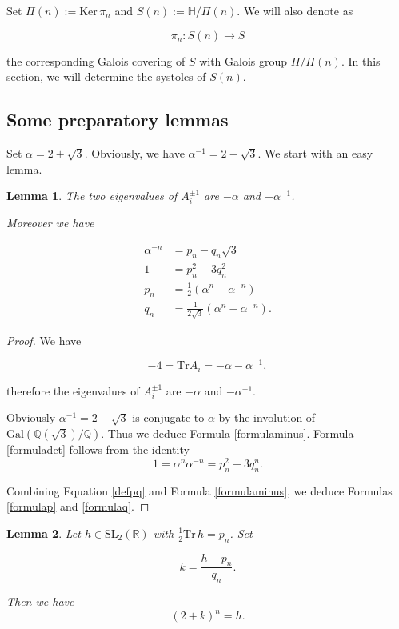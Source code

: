 \documentclass[12pt]{amsart}
\newcommand{\HP}{\mathbb{H}}
\newcommand{\Q}{\mathbb{Q}}
\newcommand{\R}{\mathbb{R}}
\newcommand{\Gal}{{\mathrm {Gal}}}
\newcommand{\Ker}{\mathrm{Ker}}
\newcommand{\SL}{{\mathrm {SL}}}
\newcommand{\Tr}{{\mathrm {Tr}}}
\newtheorem{lemma}{Lemma}
\begin{document}
\noindent Set $\Pi(n):=\Ker\,\pi_n$ and
$S(n):=\HP/\Pi(n).$ We will also denote as

$$\pi_n:S(n)\to S$$

\noindent the corresponding Galois covering of $S$ with Galois group $\Pi/\Pi(n)$. In this section,
we will determine the systoles of $S(n)$.

\subsection{Some preparatory lemmas}

Set $\alpha=2+\sqrt{3}$. Obviously, we have
$\alpha^{-1}=2-\sqrt{3}$.
We start with an easy lemma.


\begin{lemma}\label{formulas} The two eigenvalues of
$A_i^{\pm 1}$ are $-\alpha$ and $-\alpha^{-1}$.

Moreover we have

\begin{align}
\alpha^{-n}&=p_n-q_n\sqrt{3}\label{formulaminus}\\
1&=p_n^2-3q_n^2 \label{formuladet}\\
p_n&= \frac{1}{2}(\alpha^{n}+\alpha^{-n}) \label{formulap}\\
q_n&= \frac{1}{2\sqrt{3}}(\alpha^{n}-\alpha^{-n}).  \label{formulaq}
\end{align}
\end{lemma}


\begin{proof} We have

$$-4=\Tr A_i=-\alpha-\alpha^{-1},$$ 

\noindent therefore 
the eigenvalues of
$A_i^{\pm 1}$ are $-\alpha$ and $-\alpha^{-1}$.


Obviously
$\alpha^{-1}=2-\sqrt{3}$ is conjugate to $\alpha$ by the involution
of $\Gal(\Q(\sqrt{3})/\Q)$. Thus we deduce  
Formula \ref{formulaminus}. Formula
\ref{formuladet} follows from the identity
$$1=\alpha^n\alpha^{-n}=p_n^2-3q_n^n.$$

Combining Equation \ref{defpq} and Formula \ref{formulaminus}, we deduce 
Formulas \ref{formulap} and \ref{formulaq}.
\end{proof}


\begin{lemma}\label{nthroot} Let $h\in\SL_2(\R)$ with
$\frac{1}{2}\Tr\,h=p_n$. Set

$$k=\frac{h-p_n}{q_n}.$$

Then we have 
$$(2+k)^n=h.$$
\end{lemma}
\end{document}
